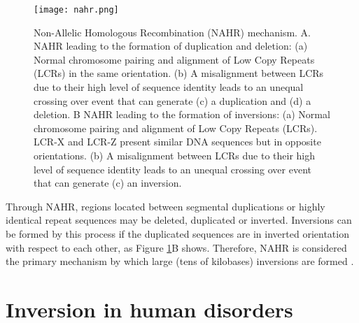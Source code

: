 \begin{figure}[h]

  \centering
    \texttt{[image: nahr.png]}

  \caption{Non-Allelic Homologous Recombination (NAHR) mechanism. A. NAHR leading to the formation of duplication and deletion: (a) Normal chromosome pairing and alignment of Low Copy Repeats (LCRs) in the same orientation. (b) A misalignment between LCRs due to their high level of sequence identity leads to an unequal crossing over event that can generate (c) a duplication and (d) a deletion. B NAHR leading to the formation of inversions: (a) Normal chromosome pairing and alignment of Low Copy Repeats (LCRs). LCR-X and LCR-Z present similar DNA sequences but in opposite orientations. (b) A misalignment between LCRs due to their high level of sequence identity leads to an unequal crossing over event that can generate (c) an inversion.}
  \label{fig:nahr}
\end{figure}

Through NAHR, regions located between segmental duplications or highly identical repeat sequences may be deleted, duplicated or inverted. Inversions can be formed by this process if the duplicated sequences are in inverted orientation with respect to each other, as Figure \ref{fig:nahr}B shows. Therefore, NAHR is considered the primary mechanism by which large (tens of kilobases) inversions are formed \cite{feuk_inversion_2010}. 

\section{Inversion in human disorders}

